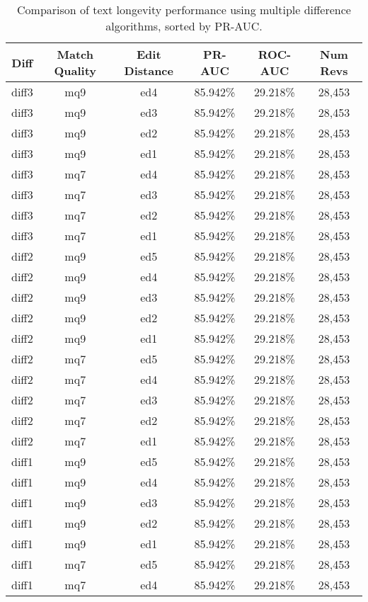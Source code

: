 \begin{table}[tbph]
\begin{center}
\begin{tabular}{|c|c|c||c|c|c|}
\hline
Diff & Match Quality & Edit Distance & PR-AUC & ROC-AUC & Num Revs \\
\hline
\hline
diff3 & mq9 & ed4 & 85.942\% & 29.218\% & 28,453 \\
diff3 & mq9 & ed3 & 85.942\% & 29.218\% & 28,453 \\
diff3 & mq9 & ed2 & 85.942\% & 29.218\% & 28,453 \\
diff3 & mq9 & ed1 & 85.942\% & 29.218\% & 28,453 \\
diff3 & mq7 & ed4 & 85.942\% & 29.218\% & 28,453 \\
diff3 & mq7 & ed3 & 85.942\% & 29.218\% & 28,453 \\
diff3 & mq7 & ed2 & 85.942\% & 29.218\% & 28,453 \\
diff3 & mq7 & ed1 & 85.942\% & 29.218\% & 28,453 \\
diff2 & mq9 & ed5 & 85.942\% & 29.218\% & 28,453 \\
diff2 & mq9 & ed4 & 85.942\% & 29.218\% & 28,453 \\
diff2 & mq9 & ed3 & 85.942\% & 29.218\% & 28,453 \\
diff2 & mq9 & ed2 & 85.942\% & 29.218\% & 28,453 \\
diff2 & mq9 & ed1 & 85.942\% & 29.218\% & 28,453 \\
diff2 & mq7 & ed5 & 85.942\% & 29.218\% & 28,453 \\
diff2 & mq7 & ed4 & 85.942\% & 29.218\% & 28,453 \\
diff2 & mq7 & ed3 & 85.942\% & 29.218\% & 28,453 \\
diff2 & mq7 & ed2 & 85.942\% & 29.218\% & 28,453 \\
diff2 & mq7 & ed1 & 85.942\% & 29.218\% & 28,453 \\
diff1 & mq9 & ed5 & 85.942\% & 29.218\% & 28,453 \\
diff1 & mq9 & ed4 & 85.942\% & 29.218\% & 28,453 \\
diff1 & mq9 & ed3 & 85.942\% & 29.218\% & 28,453 \\
diff1 & mq9 & ed2 & 85.942\% & 29.218\% & 28,453 \\
diff1 & mq9 & ed1 & 85.942\% & 29.218\% & 28,453 \\
diff1 & mq7 & ed5 & 85.942\% & 29.218\% & 28,453 \\
diff1 & mq7 & ed4 & 85.942\% & 29.218\% & 28,453 \\
\hline
\end{tabular}
\end{center}
\caption{Comparison of text longevity performance using
    multiple difference algorithms, sorted by PR-AUC.}
\label{tab:textshoutJ}
\end{table}
